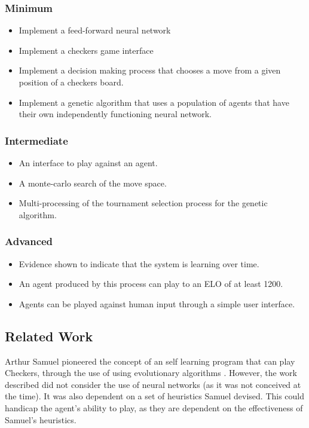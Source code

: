\documentclass[12pt,a4paper]{article}
\begin{document}
    \subsubsection*{Minimum}

    \begin{itemize}
    \item Implement a feed-forward neural network
    \item Implement a checkers game interface
    \item Implement a decision making process that chooses a move from a given position of a checkers board.
    \item Implement a genetic algorithm that uses a population of agents that have their own independently functioning neural network.
    \end{itemize}

    \subsubsection*{Intermediate}

    \begin{itemize}
    \item An interface to play against an agent.
    \item A monte-carlo search of the move space.
    \item Multi-processing of the tournament selection process for the genetic algorithm.
    \end{itemize}

    \subsubsection*{Advanced}

    \begin{itemize}
    \item Evidence shown to indicate that the system is learning over time.
    \item An agent produced by this process can play to an ELO of at least 1200.
    \item Agents can be played against human input through a simple user interface.
    \end{itemize}

\subsection*{Related Work}

    Arthur Samuel pioneered the concept of an self learning program that can play Checkers, through the use of using evolutionary algorithms \cite{samuel_studies_2000}. However, the work described did not consider the use of neural networks (as it was not conceived at the time). It was also dependent on a set of heuristics Samuel devised. This could handicap the agent's ability to play, as they are dependent on the effectiveness of Samuel's heuristics. 
\end{document}
